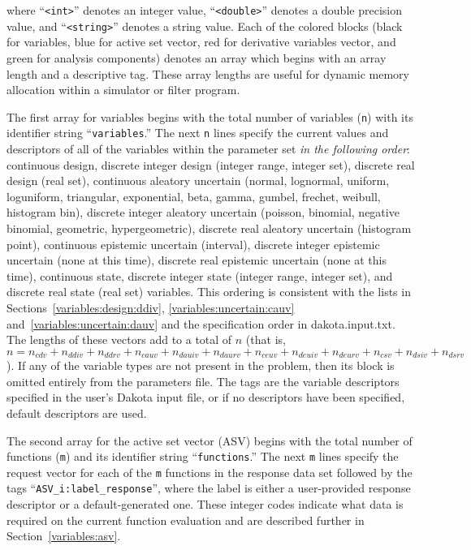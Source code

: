 where ``\texttt{<int>}'' denotes an integer value,
``\texttt{<double>}'' denotes a double precision value, and
``\texttt{<string>}'' denotes a string value. Each of the colored
blocks (black for variables, blue for active set vector, red for
derivative variables vector, and green for analysis components)
denotes an array which begins with an array length and a descriptive
tag.  These array lengths are useful for dynamic memory allocation
within a simulator or filter program.

The first array for variables begins with the total number of
variables (\texttt{n}) with its identifier string
``\texttt{variables}.''  The next \texttt{n} lines specify the current
values and descriptors of all of the variables within the parameter
set \emph{in the following order}: continuous design, discrete integer
design (integer range, integer set), discrete real design (real set),
continuous aleatory uncertain (normal, lognormal, uniform, loguniform,
triangular, exponential, beta, gamma, gumbel, frechet, weibull,
histogram bin), discrete integer aleatory uncertain (poisson,
binomial, negative binomial, geometric, hypergeometric), discrete real
aleatory uncertain (histogram point), continuous epistemic uncertain
(interval), discrete integer epistemic uncertain (none at this time),
discrete real epistemic uncertain (none at this time), continuous
state, discrete integer state (integer range, integer set), and
discrete real state (real set) variables. This ordering is consistent
with the lists in
Sections~\ref{variables:design:ddiv}, \ref{variables:uncertain:cauv}
and~\ref{variables:uncertain:dauv}
and the specification order in dakota.input.txt.  The lengths of these
vectors add to a total of $n$ (that is, $n = n_{cdv} + n_{ddiv} +
n_{ddrv} + n_{cauv} + n_{dauiv} + n_{daurv} + n_{ceuv} + n_{deuiv} +
n_{deurv} + n_{csv} + n_{dsiv} + n_{dsrv}$).  If any of the variable
types are not present in the problem, then its block is omitted
entirely from the parameters file.  The tags are the variable
descriptors specified in the user's Dakota input file, or if no
descriptors have been specified, default descriptors are used.

The second array for the active set vector (ASV) begins with the total
number of functions (\texttt{m}) and its identifier string
``\texttt{functions}.'' The next \texttt{m} lines specify the request
vector for each of the \texttt{m} functions in the response data set
followed by the tags ``\texttt{ASV\_i:label\_response}'', where the
label is either a user-provided response descriptor or a
default-generated one. These integer codes indicate what data is
required on the current function evaluation and are described further
in Section~\ref{variables:asv}.

